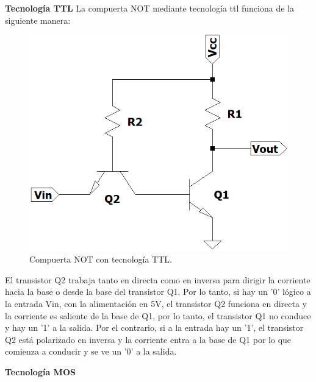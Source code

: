 \vspace{10mm}


{\large\textbf{Tecnolog\'ia TTL}}
\noindent
La compuerta NOT mediante tecnolog\'ia ttl funciona de la siguiente manera:

\begin{figure}[H]
\center
    \includegraphics[scale = 0.55]{figs/ej1/not_ttl.png}
    \caption{Compuerta NOT con tecnolog\'ia TTL.}
\label{fig:ej1_ttl}
\end{figure}

\noindent\newline
El transistor Q2 trabaja tanto en directa como en inversa para dirigir la corriente hacia la base o desde la base del transistor Q1. Por lo tanto, si hay un '0' l\'ogico a la entrada Vin, con la alimentaci\'on en 5V, el transistor Q2 funciona en directa y la corriente es saliente de la base de Q1, por lo tanto, el transistor Q1 no conduce y hay un '1' a la salida. Por el contrario, si a la entrada hay un '1', el transistor Q2 est\'a polarizado en inversa y la corriente entra a la base de Q1 por lo que comienza a conducir y se ve un '0' a la salida.

\vspace{10mm}


{\large\textbf{Tecnolog\'ia MOS}}
\noindent

